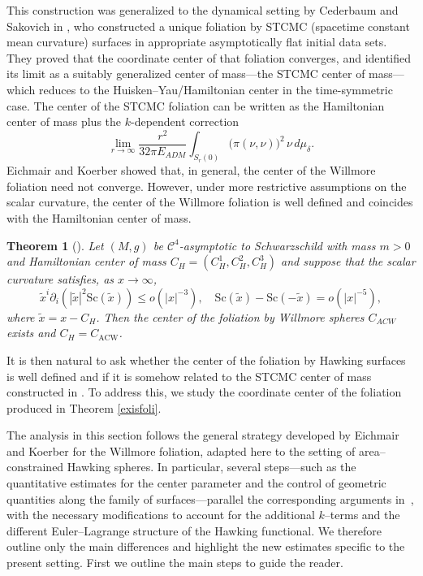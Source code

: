 \documentclass[12pt,a4paper]{amsart}
\theoremstyle{plain}
\newtheorem{theorem}{Theorem}[section]
\theoremstyle{definition}
\begin{document}
This construction was generalized to the dynamical setting by Cederbaum and Sakovich in \cite{STCMC}, who constructed a unique foliation by STCMC (spacetime constant mean curvature) surfaces in appropriate asymptotically flat initial data sets. They proved that the coordinate center of that foliation converges, and identified its limit as a suitably generalized center of mass—the STCMC center of mass—which reduces to the Huisken–Yau/Hamiltonian center in the time-symmetric case. The center of the STCMC foliation can be written as the Hamiltonian center of mass plus the \(k\)-dependent correction
\begin{equation}\label{correctstcmc}
    \lim_{r\to\infty}\frac{r^2}{32\pi E_{ADM}}\int_{S_r(0)} \big(\pi(\nu,\nu)\big)^2\, \nu \, d\mu_\delta.
\end{equation}
Eichmair and Koerber \cite{willcen} showed that, in general, the center of the Willmore foliation need not converge. However, under more restrictive assumptions on the scalar curvature, the center of the Willmore foliation is well defined and coincides with the Hamiltonian center of mass.
\begin{theorem}[{\cite[Theorem 2]{willcen}}]\label{willcenmain}
  Let \((M, g)\) be \(\mathcal{C}^4\)-asymptotic to Schwarzschild with mass \(m > 0\) and Hamiltonian
center of mass \(C_H = (C_H^1, C_H^2, C_H^3)\) and suppose that the scalar curvature satisfies, as \(x \to \infty\),
\begin{equation}
  \tilde{x}^i \partial_i(|\tilde{x}|^2 \mathrm{Sc} (\tilde{x})) \leq o(|x|^{-3}), \quad    \mathrm{Sc}(\tilde{x}) - \mathrm{Sc}(-\tilde{x}) = o(|x|^{-5}),
\end{equation}
where \(\tilde{x} = x - C_H\). Then the center of the foliation by Willmore spheres \(C_{ACW}\) exists and \(C_H = C_{\text{ACW}}\).  
\end{theorem} 
It is then natural to ask whether the center of the foliation by Hawking surfaces  is well defined and if it is somehow related to the STCMC center of mass constructed in \cite{STCMC}. To address this, we study the coordinate center of the foliation produced in Theorem \ref{exisfoli}.



The analysis in this section follows the general strategy developed by 
Eichmair and Koerber \cite{willcen} for the Willmore foliation, adapted here to the setting of area–constrained Hawking spheres.
In particular, several steps---such as the quantitative estimates for the center parameter and the control of geometric quantities along the family of surfaces---parallel
the corresponding arguments in~\cite{willcen}, 
with the necessary modifications to account for the additional $k$--terms 
and the different Euler--Lagrange structure of the Hawking functional. We therefore outline only the main differences and highlight the new estimates specific to the present setting. First we outline the main steps to guide the reader.
\end{document}
